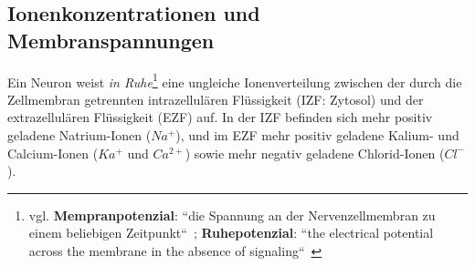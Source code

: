 \subsection{Ionenkonzentrationen und Membranspannungen}\label{sec-ionenkonzentrationen}

Ein Neuron weist \textit{in Ruhe}\footnote{
 vgl. \textbf{Mempranpotenzial}: ``die Spannung an der Nervenzellmembran zu einem beliebigen Zeitpunkt``~\cite[70]{BCP18}; \textbf{Ruhepotenzial}: ``the electrical potential across the membrane in the absence of signaling``~\cite[126]{KSJ+13}
} eine ungleiche Ionenverteilung zwischen der durch die Zellmembran getrennten intrazellulären Flüssigkeit (IZF: Zytosol) und der extrazellulären Flüssigkeit (EZF) auf.
In der IZF befinden sich mehr positiv geladene Natrium-Ionen ($Na^+$), und im EZF mehr positiv geladene Kalium- und Calcium-Ionen ($Ka^+$ und $Ca^{2+}$) sowie mehr negativ geladene Chlorid-Ionen ($Cl^-$).

